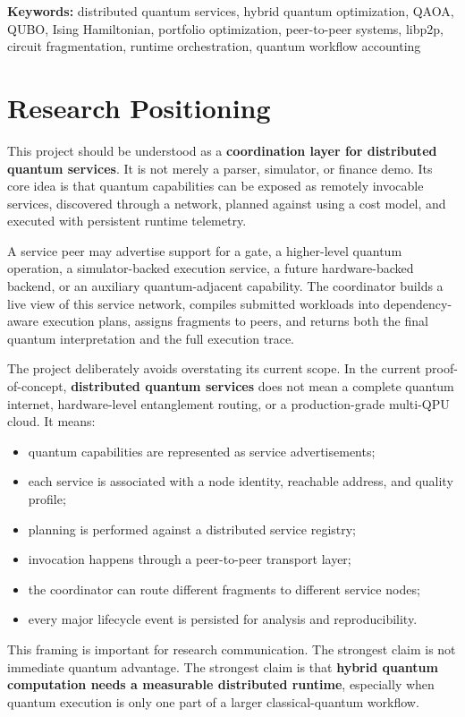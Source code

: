 \documentclass[11pt]{article}
\begin{document}
\textbf{Keywords:} distributed quantum services, hybrid quantum optimization, QAOA, QUBO, Ising Hamiltonian, portfolio optimization, peer-to-peer systems, libp2p, circuit fragmentation, runtime orchestration, quantum workflow accounting

\section{Research Positioning}

This project should be understood as a \textbf{coordination layer for distributed quantum services}. It is not merely a parser, simulator, or finance demo. Its core idea is that quantum capabilities can be exposed as remotely invocable services, discovered through a network, planned against using a cost model, and executed with persistent runtime telemetry.

A service peer may advertise support for a gate, a higher-level quantum operation, a simulator-backed execution service, a future hardware-backed backend, or an auxiliary quantum-adjacent capability. The coordinator builds a live view of this service network, compiles submitted workloads into dependency-aware execution plans, assigns fragments to peers, and returns both the final quantum interpretation and the full execution trace.

The project deliberately avoids overstating its current scope. In the current proof-of-concept, \textbf{distributed quantum services} does not mean a complete quantum internet, hardware-level entanglement routing, or a production-grade multi-QPU cloud. It means:

\begin{itemize}
\item quantum capabilities are represented as service advertisements;
\item each service is associated with a node identity, reachable address, and quality profile;
\item planning is performed against a distributed service registry;
\item invocation happens through a peer-to-peer transport layer;
\item the coordinator can route different fragments to different service nodes;
\item every major lifecycle event is persisted for analysis and reproducibility.
\end{itemize}

This framing is important for research communication. The strongest claim is not immediate quantum advantage. The strongest claim is that \textbf{hybrid quantum computation needs a measurable distributed runtime}, especially when quantum execution is only one part of a larger classical-quantum workflow.
\end{document}
